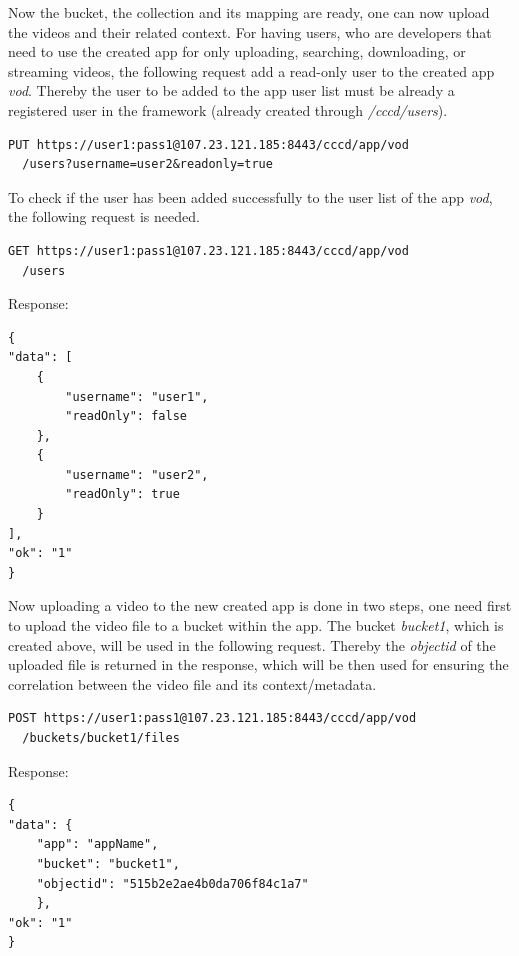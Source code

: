 Now the bucket, the collection and its mapping are ready, one can now upload the videos and their related context. For having users, who are developers that need to use the created app for only uploading, searching, downloading, or streaming videos, the following request add a read-only user to the created app \textit{vod}. Thereby the user to be added to the app user list must be already a registered user in the framework (already created through \textit{/cccd/users}).

\begin{code}
\begin{verbatim}
PUT https://user1:pass1@107.23.121.185:8443/cccd/app/vod
  /users?username=user2&readonly=true
\end{verbatim}
\end{code}

To check if the user has been added successfully to the user list of the app \textit{vod}, the following request is needed.

\begin{code}
\begin{verbatim}
GET https://user1:pass1@107.23.121.185:8443/cccd/app/vod
  /users
\end{verbatim}
Response:
\begin{verbatim}
{
"data": [
	{
		"username": "user1",
		"readOnly": false
	},
	{
		"username": "user2",
		"readOnly": true
	}
],
"ok": "1"
}
\end{verbatim}
\end{code}

Now uploading a video to the new created app is done in two steps, one need first to upload the video file to a bucket within the app. The bucket \textit{bucket1}, which is created above, will be used in the following request. Thereby the \textit{objectid} of the uploaded file is returned in the response, which will be then used for ensuring the correlation between the video file and its context/metadata.
\begin{code}
\begin{verbatim}
POST https://user1:pass1@107.23.121.185:8443/cccd/app/vod
  /buckets/bucket1/files
\end{verbatim}
Response:
\begin{verbatim}
{
"data": {
	"app": "appName",
	"bucket": "bucket1",
	"objectid": "515b2e2ae4b0da706f84c1a7"
	},
"ok": "1"
}
\end{verbatim}
\end{code}

